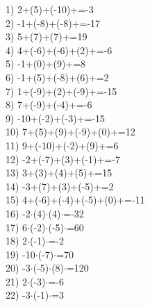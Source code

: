 \documentclass[a4paper,10pt]{article}
\begin{document}
1)   2+(5)+(-10)+=-3
\vspace{0.5cm}\\2)   -1+(-8)+(-8)+=-17
\vspace{0.5cm}\\3)   5+(7)+(7)+=19
\vspace{0.5cm}\\4)   4+(-6)+(-6)+(2)+=-6
\vspace{0.5cm}\\5)   -1+(0)+(9)+=8
\vspace{0.5cm}\\6)   -1+(5)+(-8)+(6)+=2
\vspace{0.5cm}\\7)   1+(-9)+(2)+(-9)+=-15
\vspace{0.5cm}\\8)   7+(-9)+(-4)+=-6
\vspace{0.5cm}\\9)   -10+(-2)+(-3)+=-15
\vspace{0.5cm}\\10)   7+(5)+(9)+(-9)+(0)+=12
\vspace{0.5cm}\\11)   9+(-10)+(-2)+(9)+=6
\vspace{0.5cm}\\12)   -2+(-7)+(3)+(-1)+=-7
\vspace{0.5cm}\\13)   3+(3)+(4)+(5)+=15
\vspace{0.5cm}\\14)   -3+(7)+(3)+(-5)+=2
\vspace{0.5cm}\\15)   4+(-6)+(-4)+(-5)+(0)+=-11
\vspace{0.5cm}\\16)   -2$\cdot$(4)$\cdot$(4)$\cdot$=-32
\vspace{0.5cm}\\17)   6$\cdot$(-2)$\cdot$(-5)$\cdot$=60
\vspace{0.5cm}\\18)   2$\cdot$(-1)$\cdot$=-2
\vspace{0.5cm}\\19)   -10$\cdot$(-7)$\cdot$=70
\vspace{0.5cm}\\20)   -3$\cdot$(-5)$\cdot$(8)$\cdot$=120
\vspace{0.5cm}\\21)   2$\cdot$(-3)$\cdot$=-6
\vspace{0.5cm}\\22)   -3$\cdot$(-1)$\cdot$=3
\end{document}
